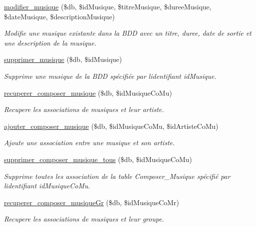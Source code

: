 \begin{DoxyCompactItemize}
\hyperlink{fonctionMusique_8php_aa289ddcb8c194a91ed1a09d3ad573920}{modifier\+\_\+musique} (\$db, \$id\+Musique, \$titre\+Musique, \$duree\+Musique, \$date\+Musique, \$description\+Musique)
\begin{DoxyCompactList}\small\item\em Modifie une musique existante dans la B\+DD avec un titre, duree, date de sortie et une description de la musique. \end{DoxyCompactList}\item 
\hyperlink{fonctionMusique_8php_a51691c70f94810c4b072c4b7efe74b41}{supprimer\+\_\+musique} (\$db, \$id\+Musique)
\begin{DoxyCompactList}\small\item\em Supprime une musique de la B\+DD spécifiée par l\textquotesingle{}identifiant \textquotesingle{}id\+Musique\textquotesingle{}. \end{DoxyCompactList}\item 
\hyperlink{fonctionMusique_8php_aab97122de21bdcebff3e545430db9288}{recuperer\+\_\+composer\+\_\+musique} (\$db, \$id\+Musique\+Co\+Mu)
\begin{DoxyCompactList}\small\item\em Recupere les associations de musiques et leur artiste. \end{DoxyCompactList}\item 
\hyperlink{fonctionMusique_8php_a8caa427d79a466dc7a5515e4d7fd6e89}{ajouter\+\_\+composer\+\_\+musique} (\$db, \$id\+Musique\+Co\+Mu, \$id\+Artiste\+Co\+Mu)
\begin{DoxyCompactList}\small\item\em Ajoute une association entre une musique et son artiste. \end{DoxyCompactList}\item 
\hyperlink{fonctionMusique_8php_a4522ce17fdee83b5a8a69cbd8793d8e8}{supprimer\+\_\+composer\+\_\+musique\+\_\+tous} (\$db, \$id\+Musique\+Co\+Mu)
\begin{DoxyCompactList}\small\item\em Supprime toutes les association de la table Composer\+\_\+\+Musique spécifié par l\textquotesingle{}identifiant \textquotesingle{}id\+Musique\+Co\+Mu\textquotesingle{}. \end{DoxyCompactList}\item 
\hyperlink{fonctionMusique_8php_a4ca358b5f3211b09e03236b8cc99c8a9}{recuperer\+\_\+composer\+\_\+musique\+Gr} (\$db, \$id\+Musique\+Co\+Mr)
\begin{DoxyCompactList}\small\item\em Recupere les associations de musiques et leur groupe. \end{DoxyCompactList}\item 

\end{DoxyCompactItemize}
